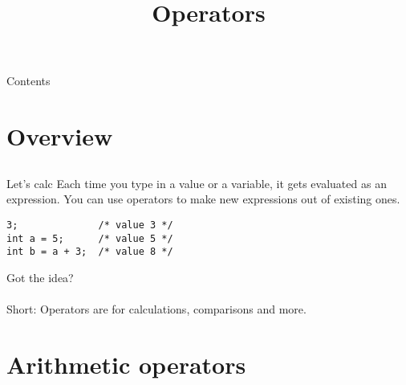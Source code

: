 
\newcommand{\topic}{
	Operators
}

\title{\topic}
\supertitle{\course}
\date{}



\maketitle

\begin{frame}{Contents}
	\tableofcontents
\end{frame}

\section{Overview}
\subsection{}
\begin{frame}[fragile]{Let's calc}
	Each time you type in a value or a variable, it gets evaluated as an expression. You can use operators to make new expressions out of existing ones.
	\begin{lstlisting}[numbers=none]
3;				/* value 3 */
int a = 5; 		/* value 5 */
int b = a + 3;	/* value 8 */
\end{lstlisting}
Got the idea?\\
\ \\Short: Operators are for calculations, comparisons and more.
\end{frame}
\section{Arithmetic operators}
